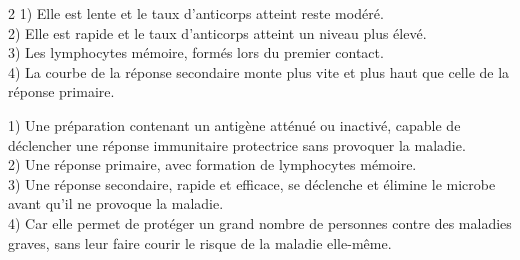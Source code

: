 \begin{multicols}{2}
1) Elle est lente et le taux d'anticorps atteint reste modéré.\\
2) Elle est rapide et le taux d'anticorps atteint un niveau plus élevé.\\
3) Les lymphocytes mémoire, formés lors du premier contact.\\
4) La courbe de la réponse secondaire monte plus vite et plus haut que celle de la
réponse primaire.

1) Une préparation contenant un antigène atténué ou inactivé, capable de déclencher une
réponse immunitaire protectrice sans provoquer la maladie.\\
2) Une réponse primaire, avec formation de lymphocytes mémoire.\\
3) Une réponse secondaire, rapide et efficace, se déclenche et élimine le microbe avant
qu'il ne provoque la maladie.\\
4) Car elle permet de protéger un grand nombre de personnes contre des maladies graves,
sans leur faire courir le risque de la maladie elle-même.

\end{multicols}
\exercicesBanner
